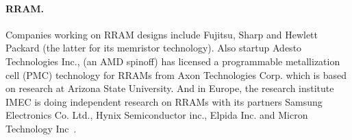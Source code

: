 \paragraph{RRAM.}


Companies working on RRAM designs include Fujitsu, Sharp and Hewlett Packard (the latter for its memristor technology). Also startup Adesto Technologies Inc., (an AMD spinoff) has licensed a programmable metallization cell (PMC) technology for RRAMs from Axon Technologies Corp. which is based on research at Arizona State University. And in Europe, the research institute IMEC is doing independent research on RRAMs with its partners Samsung Electronics Co. Ltd., Hynix Semiconductor inc., Elpida Inc. and Micron Technology Inc~\cite{Johnson10}.




